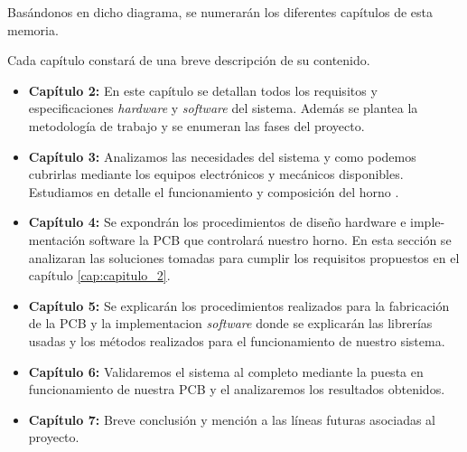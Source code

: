 Basándonos en dicho diagrama, se numerarán los diferentes capítulos de esta memoria. 

Cada capítulo constará de una breve descripción de su contenido.


\begin{itemize}

\item \textbf{Capítulo 2:} En este capítulo se detallan todos los requisitos y especificaciones \textit{hardware} y \textit{software} del sistema. Además se plantea la metodología de trabajo y se enumeran las fases del proyecto. 

\item \textbf{Capítulo 3:} Analizamos las necesidades del sistema y como podemos cubrirlas mediante los equipos electrónicos y mecánicos disponibles. Estudiamos en detalle el funcionamiento y composición del horno .  

\item \textbf{Capítulo 4:}  Se expondrán los procedimientos de diseño hardware e imple-
mentación software la \acrshort{PCB} que controlará nuestro horno. En esta sección se analizaran las soluciones tomadas para cumplir los requisitos propuestos en el capítulo \ref{cap:capitulo_2}.

\item \textbf{Capítulo 5:} Se explicarán los procedimientos realizados para la fabricación de la \acrshort{PCB} y la implementacion \textit{software} donde se explicarán las librerías usadas y los métodos realizados para el funcionamiento de nuestro sistema.

\item \textbf{Capítulo 6:} Validaremos el sistema al completo mediante la puesta en funcionamiento de nuestra \acrshort{PCB} y el analizaremos los resultados obtenidos.

\item \textbf{Capítulo 7:} Breve conclusión y mención a las líneas futuras asociadas al proyecto.   
  
\end{itemize}

\newpage
\clearpage{\pagestyle{empty}\cleardoublepage}
